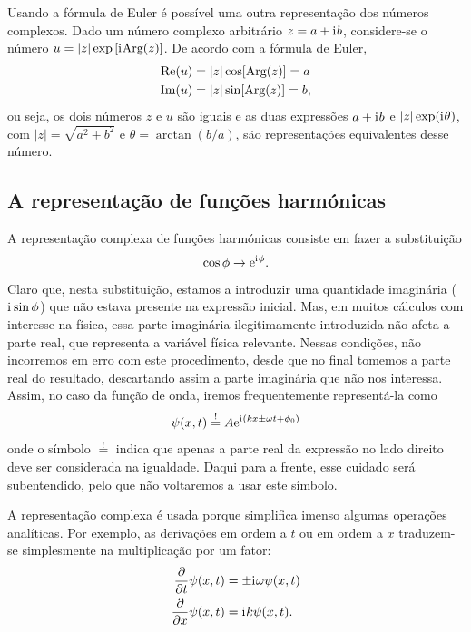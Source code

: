 Usando a fórmula de Euler é possível uma outra representação dos números
complexos. Dado um número complexo arbitrário $ z=a+\text{i}\mkern1mu b$, considere-se o
número $ u = | z|\exp\left[\text{i}\mkern1mu\text{Arg}( z)\right]$. De
acordo com a fórmula de Euler, 
\begin{align*}
  \text{Re}( u)&=| z|\cos[\text{Arg}( z)]=a\\
  \text{Im}( u)&=| z|\sin[\text{Arg}( z)]=b,
\end{align*}
ou seja, os dois números $ z$ e $ u$ são iguais e as duas expressões
$a+\text{i}\mkern1mu b$ e $| z|\exp(\text{i}\mkern1mu\theta)$, com
$| z|=\sqrt{a^2+b^2}$ e $\theta=\arctan(b/a)$, são representações
equivalentes desse número.

\subsection{A representação de funções harmónicas}
A representação complexa de funções harmónicas consiste em fazer a substituição
\begin{equation*}
  \cos\phi \rightarrow \text{e}^{\text{i}\mkern1mu \phi}.
\end{equation*}
Claro que, nesta substituição, estamos a introduzir uma quantidade imaginária
($\text{i}\mkern1mu\sin\phi$) que não estava presente na expressão inicial. Mas, em muitos
cálculos com interesse na física, essa parte imaginária ilegitimamente
introduzida não afeta a parte real, que representa a variável física relevante.
Nessas condições, não incorremos em erro com este procedimento, desde que no
final tomemos a parte real do resultado, descartando assim a parte imaginária
que não nos interessa. Assim, no caso da função de onda, iremos frequentemente
representá-la como
\begin{equation*}
  \psi(x,t)\stackrel{!}{=}A\text{e}^{\text{i}\mkern1mu(kx\pm\omega t+\phi_0)}
\end{equation*}
onde o símbolo $\stackrel{!}{=}$ indica que apenas a parte real da expressão no
lado direito deve ser considerada na igualdade. Daqui para a frente, esse
cuidado será subentendido, pelo que não voltaremos a usar este símbolo.

A representação complexa é usada porque simplifica imenso algumas operações
analíticas. Por exemplo, as derivações em ordem a $t$ ou em ordem a $x$
traduzem-se simplesmente na multiplicação por um fator:
\begin{align*}
  \frac{\partial }{\partial t}\psi(x,t)&=\pm\text{i}\mkern1mu\omega\psi(x,t)\\
  \frac{\partial }{\partial x}\psi(x,t)&=\text{i}\mkern1mu k\psi(x,t).
\end{align*}

